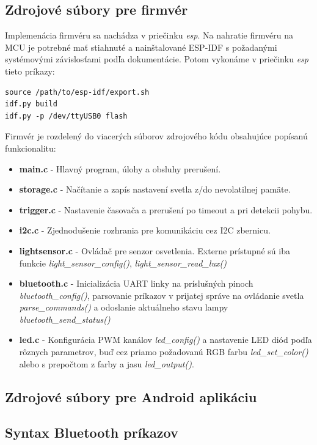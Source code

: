 \documentclass[12pt, a4paper]{article}
\begin{document}
\subsection{Zdrojové súbory pre firmvér}
Implemenácia firmvéru sa nachádza v priečinku \emph{esp}. Na nahratie firmvéru na MCU je potrebné mať stiahnuté a nainštalované ESP-IDF s požadanými systémovými závislosťami podľa dokumentácie. Potom vykonáme v priečinku \emph{esp} tieto príkazy:
\begin{verbatim}
source /path/to/esp-idf/export.sh
idf.py build
idf.py -p /dev/ttyUSB0 flash
\end{verbatim}

Firmvér je rozdelený do viacerých súborov zdrojového kódu obsahujúce popísanú funkcionalitu:
\begin{itemize}
\itemsep0pt
\item \textbf{main.c} - Hlavný program, úlohy a obsluhy prerušení.
\item \textbf{storage.c} - Načítanie a zapís nastavení svetla z/do nevolatilnej pamäte.
\item \textbf{trigger.c} - Nastavenie časovača a prerušení po timeout a pri detekcii pohybu.
\item \textbf{i2c.c} - Zjednodušenie rozhrania pre komunikáciu cez I2C zbernicu.
\item \textbf{lightsensor.c} - Ovládač pre senzor osvetlenia. Externe prístupné sú iba funkcie \emph{light\_sensor\_config()}, \emph{light\_sensor\_read\_lux()}
\item \textbf{bluetooth.c} - Inicializácia UART linky na príslušných pinoch \emph{bluetooth\_config()}, parsovanie príkazov v prijatej správe na ovládanie svetla \emph{parse\_commands()} a odoslanie aktuálneho stavu lampy \emph{bluetooth\_send\_status()}
\item \textbf{led.c} - Konfigurácia PWM kanálov \emph{led\_config()} a nastavenie LED diód podľa rôznych parametrov, buď cez priamo požadovanú RGB farbu \emph{led\_set\_color()} alebo s prepočtom z farby a jasu  \emph{led\_output()}.
\end{itemize}

\subsection{Zdrojové súbory pre Android aplikáciu}

\subsection{Syntax Bluetooth príkazov}


\end{document}
